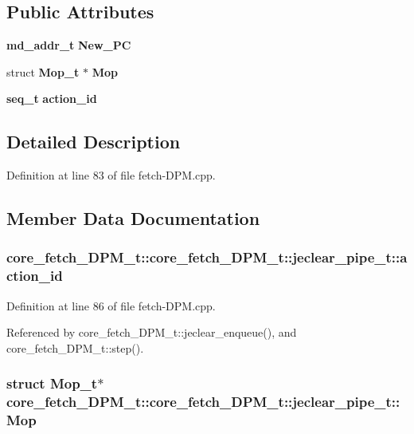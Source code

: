 \subsection*{Public Attributes}
\begin{CompactItemize}
\item 
{\bf md\_\-addr\_\-t} {\bf New\_\-PC}
\item 
struct {\bf Mop\_\-t} $\ast$ {\bf Mop}
\item 
{\bf seq\_\-t} {\bf action\_\-id}
\end{CompactItemize}


\subsection{Detailed Description}


Definition at line 83 of file fetch-DPM.cpp.

\subsection{Member Data Documentation}
\subsubsection[{action\_\-id}]{ core\_\-fetch\_\-DPM\_\-t::core\_\-fetch\_\-DPM\_\-t::jeclear\_\-pipe\_\-t::action\_\-id}\label{structcore__fetch__DPM__t_1_1jeclear__pipe__t_4261d35df90c2bde1da7b5801b026025}




Definition at line 86 of file fetch-DPM.cpp.

Referenced by core\_\-fetch\_\-DPM\_\-t::jeclear\_\-enqueue(), and core\_\-fetch\_\-DPM\_\-t::step().
\subsubsection[{Mop}]{\setlength{\rightskip}{0pt plus 5cm}struct {\bf Mop\_\-t}$\ast$ core\_\-fetch\_\-DPM\_\-t::core\_\-fetch\_\-DPM\_\-t::jeclear\_\-pipe\_\-t::Mop\hspace{0.3cm}{\tt  [read]}}\label{structcore__fetch__DPM__t_1_1jeclear__pipe__t_c55a6ed41d64a2a2aeda43a25787432b}




